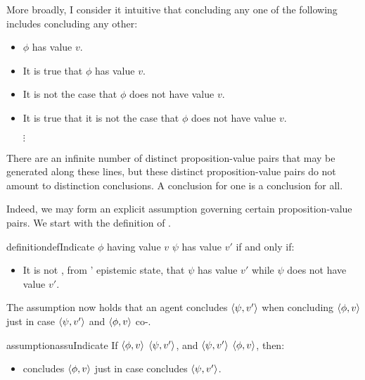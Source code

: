 \begin{note}
  More broadly, I consider it intuitive that concluding any one of the following includes concluding any other:
  \begin{itemize}
  \item \(\phi\) has value \(v\).
  \item It is true that \(\phi\) has value \(v\).
  \item It is not the case that \(\phi\) does not have value \(v\).
  \item It is true that it is not the case that \(\phi\) does not have value \(v\).
    \begin{center}
      \(\vdots\)
    \end{center}
  \end{itemize}

  There are an infinite number of distinct proposition-value pairs that may be generated along these lines, but these distinct proposition-value pairs do not amount to distinction conclusions.
  A conclusion for one is a conclusion for all.
\end{note}

\begin{note}
  Indeed, we may form an explicit assumption governing certain proposition-value pairs.
  We start with the definition of \indicateN{}.
\end{note}

\begin{note}
  \begin{restatable}[\indicateN{2}]{definition}{defIndicate}
    \label{def:indication}
    \(\phi\) having value \(v\) \emph{} \(\psi\) has value \(v'\) if and only if:
    \begin{itemize}
    \item
      It is not \epPAd{}, from \vAgent{}' epistemic state, that \(\psi\) has value \(v'\) while \(\psi\) does not have value \(v'\).
    \end{itemize}
    \vspace{-\baselineskip}
  \end{restatable}
\end{note}

\begin{note}
  The assumption now holds that an agent concludes \(\langle \psi, v' \rangle\) when concluding \(\langle \phi, v \rangle\) just in case \(\langle \psi, v' \rangle\) and \(\langle \phi, v \rangle\) co-\indicateV{}.

  \begin{restatable}[\indicateN{2}]{assumption}{assuIndicate}
    \label{assu:indication}
    If \(\langle \phi, v \rangle\)  \(\langle \psi, v' \rangle\), and \(\langle \psi, v' \rangle\)  \(\langle \phi, v \rangle\), then:

    \begin{itemize}
    \item
      \vAgent{} concludes \(\langle \phi, v \rangle\) just in case \vAgent{} concludes \(\langle \psi, v' \rangle\).
    \end{itemize}
    \vspace{-\baselineskip}
  \end{restatable}
\end{note}

